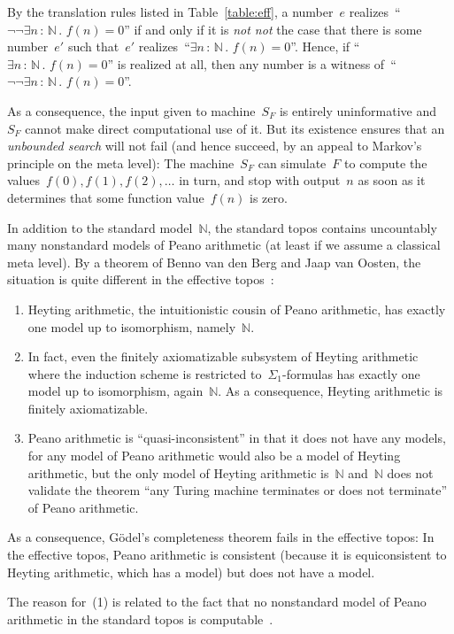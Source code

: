 \documentclass[oneside,reqno]{amsart}
\theoremstyle{definition}
\theoremstyle{plain}
\theoremstyle{remark}
\newcommand{\NN}{\mathbb{N}}
\renewcommand{\_}{\mathpunct{.}\,}
\newcommand{\effective}{ef{}fective\xspace}
\newcommand{\?}{\,{:}\,}
\begin{document}
By the translation rules listed in Table~\ref{table:eff}, a number~$e$
realizes~``$\neg\neg \exists n\?\NN\_ f(n) = 0$'' if and only if it is
\emph{not not} the case that there is some number~$e'$ such that~$e'$
realizes~``$\exists n\?\NN\_ f(n) = 0$''. Hence, if ``$\exists n\?\NN\_ f(n) =
0$'' is realized at all, then any number is a witness of~``$\neg\neg
\exists n\?\NN\_ f(n) = 0$''.

As a consequence, the input given to machine~$S_F$ is entirely uninformative
and~$S_F$ cannot make direct computational use of it. But its existence ensures that an
\emph{unbounded search} will not fail (and hence succeed, by an appeal to Markov's
principle on the meta level): The machine~$S_F$ can simulate~$F$ to
compute the values~$f(0), f(1), f(2), \ldots$ in turn, and stop
with output~$n$ as soon as it determines that some function value~$f(n)$ is zero.


\bigskip
{} In addition to the standard
model~$\NN$, the standard topos contains uncountably many nonstandard models of
Peano arithmetic (at least if we assume a classical meta level). By a theorem
of Benno van den Berg and Jaap van Oosten, the situation
is quite different in the \effective topos~\cite{berg-oosten:arithmetic}:
\begin{enumerate}
\item Heyting arithmetic, the intuitionistic cousin of Peano arithmetic, has
exactly one model up to isomorphism, namely~$\NN$.
\item In fact, even the finitely axiomatizable subsystem of Heyting arithmetic
where the induction scheme is restricted to~$\Sigma_1$-formulas has exactly one
model up to isomorphism, again~$\NN$. As a consequence, Heyting arithmetic is
finitely axiomatizable.
\item Peano arithmetic is ``quasi-inconsistent'' in that it does not have any
models, for any model of Peano arithmetic would also be a model of Heyting
arithmetic, but the only model of Heyting arithmetic is~$\NN$ and~$\NN$ does
not validate the theorem ``any Turing machine terminates or does not
terminate'' of Peano arithmetic.
\end{enumerate}
As a consequence, Gödel's completeness theorem fails in the \effective topos:
In the \effective topos, Peano arithmetic is consistent (because it is
equiconsistent to Heyting arithmetic, which has a model) but does not have a
model.

The reason for~(1) is related to the fact that no nonstandard model of
Peano arithmetic in the standard topos is computable~\cite{tennenbaum:models}.
\end{document}
